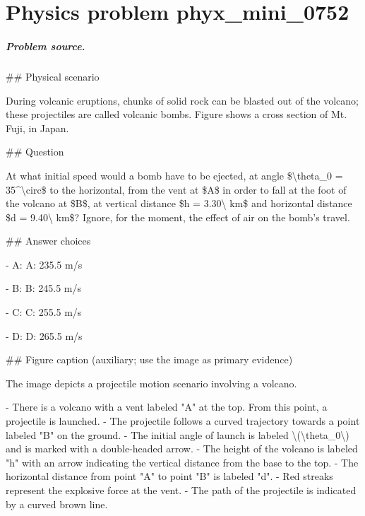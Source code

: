 
\chapter{Physics problem phyx\_mini\_0752}
\label{ch:PhyXMiniProblems_problem_phyx_mini_0752}

\paragraph{Problem source.}
\#\# Physical scenario

During volcanic eruptions, chunks of solid rock can be blasted out of the volcano; these projectiles are called volcanic bombs. Figure shows a cross section of Mt. Fuji, in Japan.

\#\# Question

At what initial speed would a bomb have to be ejected, at angle \$\textbackslash{}theta\_0 = 35\textasciicircum{}\textbackslash{}circ\$ to the horizontal, from the vent at \$A\$ in order to fall at the foot of the volcano at \$B\$, at vertical distance \$h = 3.30\textbackslash{} km\$ and horizontal distance \$d = 9.40\textbackslash{} km\$? Ignore, for the moment, the effect of air on the bomb's travel.

\#\# Answer choices

- A: A: 235.5 m/s

- B: B: 245.5 m/s

- C: C: 255.5 m/s

- D: D: 265.5 m/s

\#\# Figure caption (auxiliary; use the image as primary evidence)

The image depicts a projectile motion scenario involving a volcano.

- There is a volcano with a vent labeled "A" at the top. From this point, a projectile is launched.
- The projectile follows a curved trajectory towards a point labeled "B" on the ground.
- The initial angle of launch is labeled \textbackslash{}(\textbackslash{}theta\_0\textbackslash{}) and is marked with a double-headed arrow.
- The height of the volcano is labeled "h" with an arrow indicating the vertical distance from the base to the top.
- The horizontal distance from point "A" to point "B" is labeled "d".
- Red streaks represent the explosive force at the vent.
- The path of the projectile is indicated by a curved brown line.

